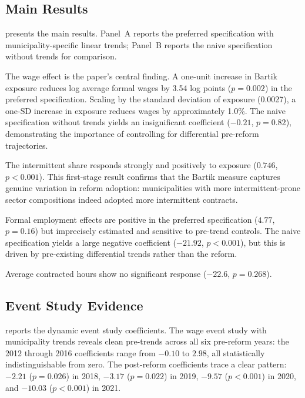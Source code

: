 \documentclass[12pt]{article}
\begin{document}
\subsection{Main Results}

 presents the main results. Panel~A reports the preferred specification with municipality-specific linear trends; Panel~B reports the naive specification without trends for comparison.

The wage effect is the paper's central finding. A one-unit increase in Bartik exposure reduces log average formal wages by 3.54 log points ($p = 0.002$) in the preferred specification. Scaling by the standard deviation of exposure (0.0027), a one-SD increase in exposure reduces wages by approximately 1.0\%. The naive specification without trends yields an insignificant coefficient ($-0.21$, $p = 0.82$), demonstrating the importance of controlling for differential pre-reform trajectories.

The intermittent share responds strongly and positively to exposure ($0.746$, $p < 0.001$). This first-stage result confirms that the Bartik measure captures genuine variation in reform adoption: municipalities with more intermittent-prone sector compositions indeed adopted more intermittent contracts.

Formal employment effects are positive in the preferred specification ($4.77$, $p = 0.16$) but imprecisely estimated and sensitive to pre-trend controls. The naive specification yields a large negative coefficient ($-21.92$, $p < 0.001$), but this is driven by pre-existing differential trends rather than the reform.

Average contracted hours show no significant response ($-22.6$, $p = 0.268$).



\subsection{Event Study Evidence}

 reports the dynamic event study coefficients. The wage event study with municipality trends reveals clean pre-trends across all six pre-reform years: the 2012 through 2016 coefficients range from $-0.10$ to $2.98$, all statistically indistinguishable from zero. The post-reform coefficients trace a clear pattern: $-2.21$ ($p = 0.026$) in 2018, $-3.17$ ($p = 0.022$) in 2019, $-9.57$ ($p < 0.001$) in 2020, and $-10.03$ ($p < 0.001$) in 2021.
\end{document}
